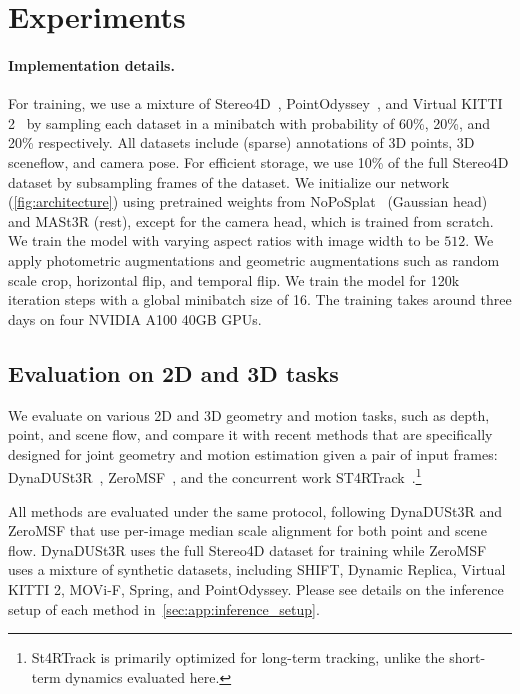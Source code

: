 \section{Experiments}
\label{sec:experiment}

\paragraph{Implementation details.}
For training, we use a mixture of Stereo4D~\citep{Jin:2025:S4D}, PointOdyssey~\citep{Zheng:2023:POA}, and Virtual KITTI 2~\citep{Gaidon:2016:VWP} by sampling each dataset in a minibatch with probability of 60\%, 20\%, and 20\% respectively.
All datasets include (sparse) annotations of 3D points, 3D sceneflow, and camera pose.
For efficient storage, we use 10\% of the full Stereo4D dataset by subsampling frames of the dataset.
We initialize our network (\cref{fig:architecture}) using pretrained weights from NoPoSplat~\citep{Ye:2025:NPN} (Gaussian head) and MASt3R \citep{Leroy:2024:GIM} (rest), except for the camera head, which is trained from scratch.
We train the model with varying aspect ratios with image width to be $512$.
We apply photometric augmentations and geometric augmentations such as random scale crop, horizontal flip, and temporal flip.
We train the model for 120k iteration steps with a global minibatch size of 16.
The training takes around three days on four NVIDIA A100 40GB GPUs.

\subsection{Evaluation on 2D and 3D tasks}
\label{sec:exp:eval_2d_3d}
We evaluate \ourmethod{} on various 2D and 3D geometry and motion tasks, such as depth, point, and scene flow, and compare it with recent methods that are specifically designed for joint geometry and motion estimation given a pair of input frames: DynaDUSt3R~\citep{Jin:2025:S4D}, ZeroMSF~\citep{Liang:2025:ZSM}, and the concurrent work ST4RTrack~\citep{Feng:2025:ST4}.\footnote{St4RTrack is primarily optimized for long-term tracking, unlike the short-term dynamics evaluated here.}

All methods are evaluated under the same protocol, following DynaDUSt3R and ZeroMSF that use per-image median scale alignment for both point and scene flow. DynaDUSt3R uses the full Stereo4D dataset for training while ZeroMSF uses a mixture of synthetic datasets, including SHIFT, Dynamic Replica, Virtual KITTI 2, MOVi-F, Spring, and PointOdyssey. 
Please see details on the inference setup of each method in~\cref{sec:app:inference_setup}.


